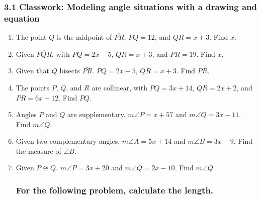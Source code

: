 \documentclass[12pt, twoside]{article}
\begin{document}
  \subsubsection*{3.1 Classwork: Modeling angle situations with a drawing and equation}
  \begin{enumerate}
    \subsubsection*{Do Not Solve! Make a drawing on the right, an equation to the left, and circle where it states what to find.}
    \vspace{0.5cm}

\item The point $Q$ is the midpoint of $\overline{PR}$, $PQ=12$, and $QR=x+3$. Find ${x}$.
\vspace{4cm}

\item Given $\overline{PQR}$, with $PQ=2x-5$, $QR=x+3$, and $PR=19$. Find ${x}$.
\vspace{4cm}

\item Given that $Q$ bisects $\overline{PR}$. $PQ=2x-5$, $QR=x+3$. Find ${PR}$.
\vspace{4cm}

\item The points $P$, $Q$, and $R$ are collinear, with $PQ=3x+14$, $QR=2x+2$, and $PR=6x+12$. Find ${PQ}$.
\vspace{4cm}

\newpage

\item Angles $P$ and $Q$ are supplementary. $m\angle P = x+57$ and $m\angle Q = 3x-11$. Find $m\angle Q$. \vspace{3.5cm} 

\item Given two complementary angles, $m\angle A = 5x+14$ and $m\angle B = 3x-9$. Find the measure of $\angle B$. \vspace{3.5cm} 

\item Given $P \cong Q$. $m\angle P = 3x+20$ and $m\angle Q = 2x-10$. Find $m\angle Q$. \vspace{3.5cm} 

\subsubsection*{For the following problem, calculate the length.}


\end{enumerate}
\end{document}
